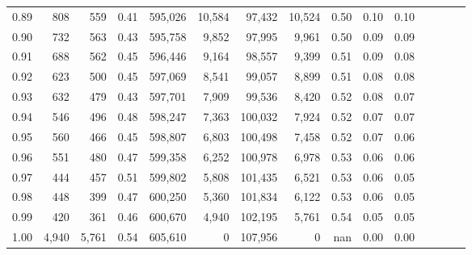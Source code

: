 \begin{tabular}{rrrcrrrrrrrrrrr}
0.89 &     808 &    559 &                                       0.41 &  595,026 &   10,584 &   97,432 &   10,524 &  0.50 &  0.10 &                         0.10 \\
0.90 &     732 &    563 &                                       0.43 &  595,758 &    9,852 &   97,995 &    9,961 &  0.50 &  0.09 &                         0.09 \\
0.91 &     688 &    562 &                                       0.45 &  596,446 &    9,164 &   98,557 &    9,399 &  0.51 &  0.09 &                         0.08 \\
0.92 &     623 &    500 &                                       0.45 &  597,069 &    8,541 &   99,057 &    8,899 &  0.51 &  0.08 &                         0.08 \\
0.93 &     632 &    479 &                                       0.43 &  597,701 &    7,909 &   99,536 &    8,420 &  0.52 &  0.08 &                         0.07 \\
0.94 &     546 &    496 &                                       0.48 &  598,247 &    7,363 &  100,032 &    7,924 &  0.52 &  0.07 &                         0.07 \\
0.95 &     560 &    466 &                                       0.45 &  598,807 &    6,803 &  100,498 &    7,458 &  0.52 &  0.07 &                         0.06 \\
0.96 &     551 &    480 &                                       0.47 &  599,358 &    6,252 &  100,978 &    6,978 &  0.53 &  0.06 &                         0.06 \\
0.97 &     444 &    457 &                                       0.51 &  599,802 &    5,808 &  101,435 &    6,521 &  0.53 &  0.06 &                         0.05 \\
0.98 &     448 &    399 &                                       0.47 &  600,250 &    5,360 &  101,834 &    6,122 &  0.53 &  0.06 &                         0.05 \\
0.99 &     420 &    361 &                                       0.46 &  600,670 &    4,940 &  102,195 &    5,761 &  0.54 &  0.05 &                         0.05 \\
1.00 &   4,940 &  5,761 &                                       0.54 &  605,610 &        0 &  107,956 &        0 &   nan &  0.00 &                         0.00 \\
\bottomrule
\end{tabular}
